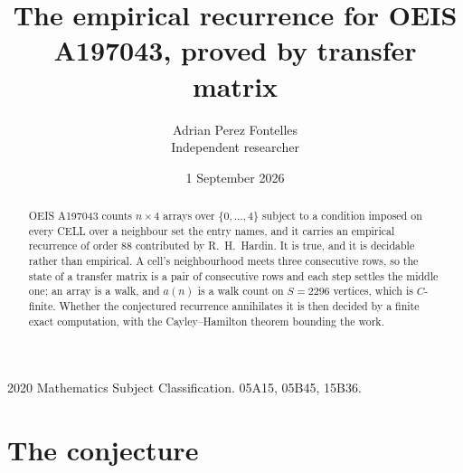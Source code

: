 \documentclass[11pt,a4paper]{article}
\title{The empirical recurrence for OEIS A197043, proved by transfer matrix}
\author{Adrian Perez Fontelles\\ \small Independent researcher}
\date{1 September 2026}
\theoremstyle{plain}
\theoremstyle{definition}
\begin{document}
\maketitle

\begin{abstract}
OEIS A197043 counts $n\times4$ arrays over $\{0,\dots,4\}$ subject to a condition imposed on
every CELL over a neighbour set the entry names, and it carries an empirical recurrence of
order $88$ contributed by R.~H.~Hardin. It is true, and it is decidable rather than
empirical. A cell's neighbourhood meets three consecutive rows, so the state of a transfer
matrix is a pair of consecutive rows and each step settles the middle one; an array is a
walk, and $a(n)$ is a walk count on $S=2296$ vertices, which is $C$-finite. Whether the
conjectured recurrence annihilates it is then decided by a finite exact computation, with the
Cayley--Hamilton theorem bounding the work.
\end{abstract}

\noindent\small 2020 Mathematics Subject Classification. 05A15, 05B45, 15B36.\normalsize

\section{The conjecture}
\end{document}
